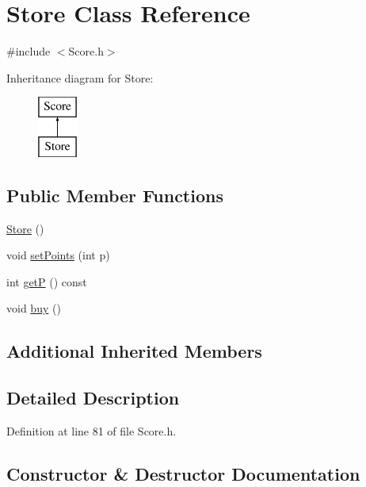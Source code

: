 \hypertarget{class_store}{}\section{Store Class Reference}
\label{class_store}


{\ttfamily \#include $<$Score.\+h$>$}

Inheritance diagram for Store\+:\begin{figure}[H]
\begin{center}
\leavevmode
\includegraphics[height=2.000000cm]{class_store}
\end{center}
\end{figure}
\subsection*{Public Member Functions}
\begin{DoxyCompactItemize}
\item 
\hyperlink{class_store_a5f58eadcb7385d5a5aa6830daef84f7d}{Store} ()
\item 
void \hyperlink{class_store_a6ed77ae11cd2e113b4865b16d7478fbc}{set\+Points} (int p)
\item 
int \hyperlink{class_store_a1aac09e876734e5b27994dbd220b07fe}{getP} () const
\item 
void \hyperlink{class_store_ad1d0cf3b358c21e26f2c357040330847}{buy} ()
\end{DoxyCompactItemize}
\subsection*{Additional Inherited Members}


\subsection{Detailed Description}


Definition at line 81 of file Score.\+h.



\subsection{Constructor \& Destructor Documentation}
\hypertarget{class_store_a5f58eadcb7385d5a5aa6830daef84f7d}{}\label{class_store_a5f58eadcb7385d5a5aa6830daef84f7d} 

